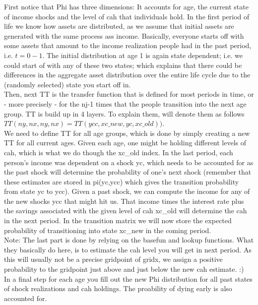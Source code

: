 \documentclass[12pt,a4paper]{article}
\begin{document}
First notice that Phi has three dimensions: It accounts for age, the current state of income shocks and the level of cah that individuals hold. In the first period of life we know how assets are distributed, as we assume that initial assets are generated with the same process ass income. Basically, everyone starts off with some assets that amount to the income realization people had in the past period, i.e. $t=0-1$. The initial distribution at age 1 is again state dependent; i.e. we could start of with any of these two states; which explains that there could be differences in the aggregate asset distribution over the entire life cycle due to the (randomly selected) state you start off in. \\

Then, next TT is the transfer function that is defined for most periods in time, or - more precisely - for the nj-1 times that the people transition into the next age group. TT is build up in 4 layers. To explain them,  will denote them as follows $TT(ny,nx,ny,nx)=TT(ycc, xc\_new,yc,xc\_old))$.\\

We need to define TT for all age groups, which is done by simply creating a new TT for all current ages. Given each age, one might be holding different levels of cah, which is what we do though the xc\_old index. In the last period, each person's income was dependent on a shock yc, which needs to be accounted for as the past shock will determine the probability of one's next shock (remember that these estimates are stored in pi(yc,ycc) which gives the transition probability from state yc to ycc). Given a past shock, we can compute the income for any of the new shocks ycc that might hit us.  That income times the interest rate plus the savings associated with the given level of cah xc\_old will determine the cah in the next period. In the transition matrix we will now store the expected probability of transitioning into state xc\_new in the coming period. \\

Note: The last part is done by relying on the basefun and lookup functions. What they basically do here, is to estimate the cah level you will get in next period. As this will usually not be a precise gridpoint of gridx, we assign a positive probability to the gridpoint just above and just below the new cah estimate. :) \\

In a final step for each age you fill out the new Phi distribution for all past states of shock realizations and cah holdings. The proability of dying early is also accounted for.\\
\end{document}
